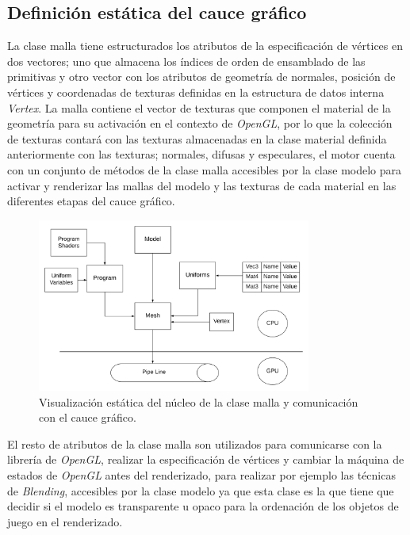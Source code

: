 \documentclass[a4paper]{book}
\begin{document}
\subsection{Definición estática del cauce gráfico}

La clase malla tiene estructurados los atributos de la especificación de vértices en dos vectores; uno que almacena los índices de
orden de ensamblado de las primitivas y otro vector con los atributos de geometría de normales, posición de vértices y coordenadas de texturas
definidas en la estructura de datos interna \textit{Vertex}. La malla contiene el vector de texturas que componen el material de la geometría para su
activación en el contexto de \textit{OpenGL}, por lo que la colección de texturas contará con las texturas almacenadas en la clase material definida 
anteriormente con las texturas; normales, difusas y especulares, el motor cuenta con un conjunto de métodos de la clase malla accesibles por la clase
modelo para activar y renderizar las mallas del modelo y las texturas de cada material en las diferentes etapas del cauce gráfico.

\begin{figure}[H]
    \centering
    \includegraphics[width=9cm, keepaspectratio]{img/StaticPipe.png}
    \caption{Visualización estática del núcleo de la clase malla y comunicación con el cauce gráfico.}
    \label{custom_textures}
\end{figure}

El resto de atributos de la clase malla son utilizados para comunicarse con la librería de \textit{OpenGL}, realizar la especificación de
vértices y cambiar la máquina de estados de \textit{OpenGL} antes del renderizado, para realizar por ejemplo las técnicas de 
\textit{Blending}, accesibles por la clase modelo ya que esta clase es la que tiene que decidir si el modelo
es transparente u opaco para la ordenación de los objetos de juego en el renderizado. \cite{article:_transparnet_shadows}
\end{document}
